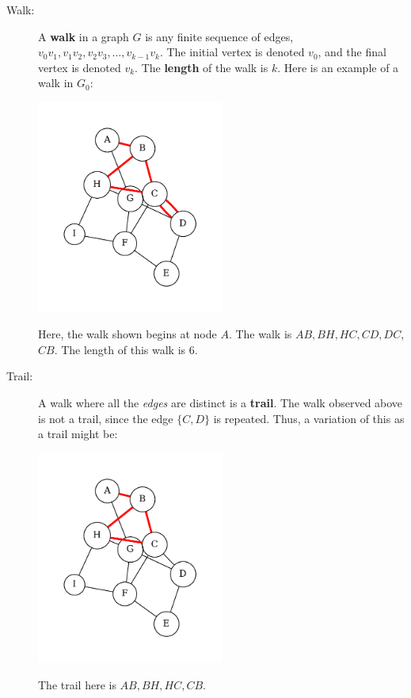 \begin{description}
    \item[Walk:] A \textbf{walk} in a graph $G$ is any finite sequence of edges, $v_0v_1, v_1v_2, v_2v_3, \ldots, v_{k-1}v_k$. The initial vertex is denoted $v_0$, and the final vertex is denoted $v_k$. The \textbf{length} of the walk is $k$. Here is an example of a walk in $G_0$:
    \begin{center}
        \includegraphics[width=0.5\textwidth]{Chapter2/walk.pdf}
    \end{center}
    Here, the walk shown begins at node $A$. The walk is $AB, BH, HC, CD, DC$, $CB$. The length of this walk is 6.
    \item[Trail:] A walk where all the \emph{edges} are distinct is a \textbf{trail}. The walk observed above is not a trail, since the edge $\{C, D\}$ is repeated. Thus, a variation of this as a trail might be:
    \begin{center}
        \includegraphics[width=0.5\textwidth]{Chapter2/trail.pdf}
    \end{center}
    The trail here is $AB, BH, HC, CB$.

\end{description}
